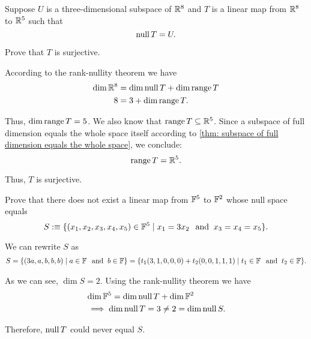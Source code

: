 \begin{xrcs}
  Suppose $U$ is a three-dimensional subspace of $\mathbb{R}^8$ and $T$ is a linear map from $\mathbb{R}^8$ to $\mathbb{R}^5$ such that
  \begin{equation}
    \operatorname{null} T = U.
  \end{equation}

  Prove that $T$ is surjective.

  \begin{xprf}
    According to the rank-nullity theorem we have
    \begin{equation}
      \begin{aligned}
        \dim \mathbb{R}^8 &= \dim \operatorname{null} T + \dim \operatorname{range} T \\
                 8 &= 3 + \dim \operatorname{range} T.
      \end{aligned}
    \end{equation}

    Thus, $\dim \operatorname{range} T = 5$. We also know that $\operatorname{range} T \subseteq \mathbb{R}^5$. Since a subspace of full dimension equals the whole space itself according to \ref{thm: subspace of full dimension equals the whole space}, we conclude:
    \begin{equation}
      \operatorname{range} T = \mathbb{R}^5.
    \end{equation}

    Thus, $T$ is surjective.
  \end{xprf}
\end{xrcs}

\begin{xrcs}
  Prove that there does not exist a linear map from $\mathbb{F}^5$ to  $\mathbb{F}^2$ whose null space equals
  \begin{equation}
    S :\equiv \{(x_1, x_2, x_3, x_4, x_5) \in \mathbb{F}^5 \mid x_1 = 3 x_2 \;\;\, \text{and}\;\; x_3 = x_4 = x_5 \}.
  \end{equation}

  \begin{xprf}
    We can rewrite $S$ as
    \begin{equation}
      \begin{aligned}
        S = \{ ( 3a, a, b,b,b) \mid a \in \mathbb{F} \;\;\, \text{and}\;\; b \in \mathbb{F} \}
        = \{ t_1 (3,1,0,0,0) + t_2 (0,0,1,1,1) \mid  t_1 \in \mathbb{F} \;\;\, \text{and}\;\; t_2 \in \mathbb{F} \}.
      \end{aligned}
    \end{equation}

    As we can see, $\dim S = 2$. Using the rank-nullity theorem we have
    \begin{equation}
      \begin{aligned}
        &\dim \mathbb{F}^5 = \dim \operatorname{null} T + \dim \mathbb{F}^2 \\
        &\implies \dim \operatorname{null} T = 3 \neq 2 = \dim \operatorname{null} S.
      \end{aligned}
    \end{equation}

    Therefore, $\operatorname{null} T$ could never equal $S$.
  \end{xprf}
\end{xrcs}

